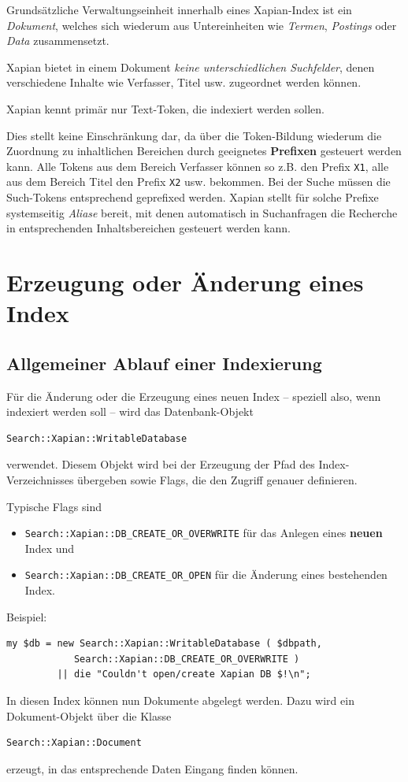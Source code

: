 \documentclass[11pt, twoside, a4paper, BCOR8mm, DIV12, bibtotoc,idxtotoc]{scrbook}
\begin{document}
Grundsätzliche Verwaltungseinheit innerhalb eines Xapian-Index ist ein
\emph{Dokument}, welches sich wiederum aus Untereinheiten wie \emph{Termen},
\emph{Postings} oder \emph{Data} zusammensetzt.

Xapian bietet in einem Dokument \emph{keine unterschiedlichen
  Suchfelder}, denen verschiedene Inhalte wie Verfasser, Titel
usw. zugeordnet werden können. 

Xapian kennt primär nur Text-Token, die indexiert werden sollen.

Dies stellt keine Einschränkung dar, da über die Token-Bildung
wiederum die Zuordnung zu inhaltlichen Bereichen durch geeignetes
\textbf{Prefixen} gesteuert werden kann. Alle Tokens aus dem Bereich
Verfasser können so z.B. den Prefix \texttt{X1}, alle aus dem Bereich
Titel den Prefix \texttt{X2} usw. bekommen. Bei der Suche müssen die
Such-Tokens entsprechend geprefixed werden. Xapian stellt für solche
Prefixe systemseitig \emph{Aliase} bereit, mit denen automatisch in
Suchanfragen die Recherche in entsprechenden Inhaltsbereichen gesteuert
werden kann.
 
\section{Erzeugung oder Änderung eines Index}


\subsection{Allgemeiner Ablauf einer Indexierung}

Für die Änderung oder die Erzeugung eines neuen Index -- speziell
also, wenn indexiert werden soll -- wird das Datenbank-Objekt
\begin{verbatim}
Search::Xapian::WritableDatabase
\end{verbatim}
verwendet. Diesem Objekt wird bei der Erzeugung der Pfad des
Index-Verzeichnisses übergeben sowie Flags, die den Zugriff genauer
definieren.

Typische Flags sind
\begin{itemize}
\item \texttt{Search::Xapian::DB\_CREATE\_OR\_OVERWRITE} für das
  Anlegen eines \textbf{neuen} Index und
\item \texttt{Search::Xapian::DB\_CREATE\_OR\_OPEN} für die Änderung
  eines bestehenden Index.
\end{itemize}

Beispiel:
\begin{verbatim}
my $db = new Search::Xapian::WritableDatabase ( $dbpath,
            Search::Xapian::DB_CREATE_OR_OVERWRITE ) 
         || die "Couldn't open/create Xapian DB $!\n";
\end{verbatim}
In diesen Index können nun Dokumente abgelegt werden. Dazu wird ein
Dokument-Objekt über die Klasse
\begin{verbatim}
Search::Xapian::Document
\end{verbatim}
erzeugt, in das entsprechende Daten Eingang finden können.
\end{document}
